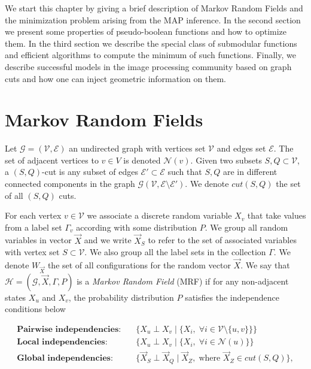 We start this chapter by giving a brief description of Markov Random Fields and the minimization problem arising from the MAP inference. In the second section we present some properties of pseudo-boolean functions and how to optimize them. In the third section we describe the special class of submodular functions and efficient algorithms to compute the minimum of such functions. Finally, we describe successful models in the image processing community based on graph cuts and how one can inject geometric information on them.


\section{Markov Random Fields}
\label{ch2:sec:markov-random-fields}

Let $\mathcal{G}=(\mathcal{V},\mathcal{E})$ an undirected graph with vertices set $\mathcal{V}$ and edges set $\mathcal{E}$. The set of adjacent vertices to $v \in V$ is denoted $\mathcal{N}(v)$. Given two subsets $S,Q \subset \mathcal{V}$, a $(S,Q)$-cut is any subset of edges $\mathcal{E}' \subset \mathcal{E}$ such that $S,Q$ are in different connected components in the graph $\mathcal{G}(\mathcal{V},\mathcal{E} \setminus \mathcal{E}')$. We denote $cut(S,Q)$ the set of all $(S,Q)$ cuts.

For each vertex $v \in \mathcal{V}$ we associate a discrete random variable $X_v$ that take values from a label set $\Gamma_v$ according with some distribution $P$. We group all random variables in vector $\vec{X}$ and we write $\vec{X}_S$ to refer to the set of associated variables with vertex set $S \subset \mathcal{V}$. We also group all the label sets in the collection $\Gamma$. We denote $W_{\vec{X}}$ the set of all configurations for the random vector $\vec{X}$. We say that $\mathcal{H} =(\mathcal{G},\vec{X},\Gamma,P)$ is a \emph{Markov Random Field} (MRF) if for any non-adjacent states $X_u$ and $X_v$, the probability distribution $P$  satisfies the independence conditions below

\begin{align}
	\textbf{Pairwise independencies:}&\quad \Big\{ X_u \perp X_v \;|\; \big\{X_i,\; \forall i \in \mathcal{V}\setminus\{u,v\} \big\}  \Big\} \label{ch2:eq:markov-pairwise-independencies}   \\
	\textbf{Local independencies:}&\quad \Big\{ X_u \perp X_v \;|\; \big\{X_i, \; \forall i \in \mathcal{N}(u)  \big\} \Big\} \label{ch2:eq:markov-local-independencies} \\
	\textbf{Global independencies:}& \quad \Big\{ \vec{X}_S \perp \vec{X}_Q \;|\; \vec{X}_Z,\; \text{where } \vec{X}_Z \in cut(S,Q) \Big\} \label{ch2:eq:markov-global-independencies},
\end{align}

